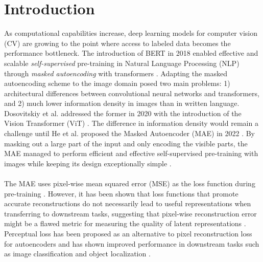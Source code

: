 \section{Introduction}

As computational capabilities increase, deep learning models for computer vision (CV) are growing to the point where access to labeled data becomes the performance bottleneck. The introduction of BERT in 2018 enabled effective and scalable \textit{self-supervised} pre-training in Natural Language Processing (NLP) through \textit{masked autoencoding} with transformers \cite{bert}. Adapting the masked autoencoding scheme to the image domain posed two main problems: 1) architectural differences between convolutional neural networks and transformers, and 2) much lower information density in images than in written language. Dosovitskiy et al. addressed the former in 2020 with the introduction of the Vision Transformer (ViT) \cite{vit}. The difference in information density would remain a challenge until He et al. proposed the Masked Autoencoder (MAE) in 2022 \cite{mae}. By masking out a large part of the input and only encoding the visible parts, the MAE managed to perform efficient and effective self-supervised pre-training with images while keeping its design exceptionally simple \cite{mae}.
\\\\
The MAE uses pixel-wise mean squared error (MSE) as the loss function during pre-training \cite{mae}. However, it has been shown that loss functions that promote accurate reconstructions do not necessarily lead to useful representations when transferring to downstream tasks, suggesting that pixel-wise reconstruction error might be a flawed metric for measuring the quality of latent representations \cite{perceptualautoencoder, ganautoencoder}. Perceptual loss has been proposed as an alternative to pixel reconstruction loss for autoencoders and has shown improved performance in downstream tasks such as image classification and object localization \cite{perceptualautoencoder}.
